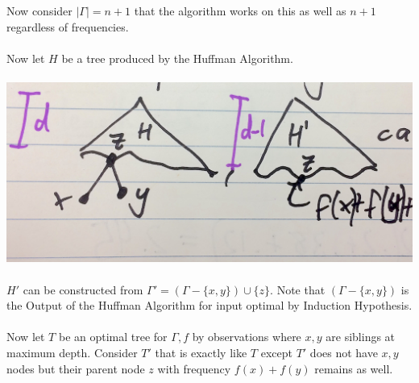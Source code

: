 \documentclass[12pt]{article}
\begin{document}
Now consider $|\Gamma| = n+1$ that the algorithm works on this as well as $n+1$ regardless of frequencies.\\
\\
Now let $H$ be a tree produced by the Huffman Algorithm.\\
\\
\includegraphics[scale=0.125]{lec4-3}
\\
\\
$H'$ can be constructed from $\Gamma' = (\Gamma - \{ x,y \}) \cup \{ z \}$. Note that $(\Gamma - \{ x,y \})$ is the Output of the Huffman Algorithm for input optimal by Induction Hypothesis.\\
\\
Now let $T$ be an optimal tree for $\Gamma, f$ by observations where $x,y$ are siblings at maximum depth. Consider $T'$ that is exactly like $T$ except $T'$ does not have $x,y$ nodes but their parent node $z$ with frequency $f(x) + f(y)$ remains as well.
\\
\\
\end{document}

